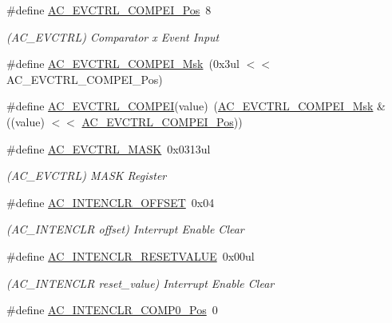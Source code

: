 \begin{DoxyCompactItemize}
\item 
\#define \mbox{\hyperlink{group___s_a_m_d21___a_c_ga3ecb80c6d080322ab734ade29f0fb26e}{A\+C\+\_\+\+E\+V\+C\+T\+R\+L\+\_\+\+C\+O\+M\+P\+E\+I\+\_\+\+Pos}}~8
\begin{DoxyCompactList}\small\item\em (A\+C\+\_\+\+E\+V\+C\+T\+RL) Comparator x Event Input \end{DoxyCompactList}\item 
\#define \mbox{\hyperlink{group___s_a_m_d21___a_c_ga232a5136dbe43c2aad98fa1cb2cb702f}{A\+C\+\_\+\+E\+V\+C\+T\+R\+L\+\_\+\+C\+O\+M\+P\+E\+I\+\_\+\+Msk}}~(0x3ul $<$$<$ A\+C\+\_\+\+E\+V\+C\+T\+R\+L\+\_\+\+C\+O\+M\+P\+E\+I\+\_\+\+Pos)
\item 
\#define \mbox{\hyperlink{group___s_a_m_d21___a_c_ga76a37d2193149d76c4fffe6ca4372c97}{A\+C\+\_\+\+E\+V\+C\+T\+R\+L\+\_\+\+C\+O\+M\+P\+EI}}(value)~(\mbox{\hyperlink{group___s_a_m_d21___a_c_ga232a5136dbe43c2aad98fa1cb2cb702f}{A\+C\+\_\+\+E\+V\+C\+T\+R\+L\+\_\+\+C\+O\+M\+P\+E\+I\+\_\+\+Msk}} \& ((value) $<$$<$ \mbox{\hyperlink{group___s_a_m_d21___a_c_ga3ecb80c6d080322ab734ade29f0fb26e}{A\+C\+\_\+\+E\+V\+C\+T\+R\+L\+\_\+\+C\+O\+M\+P\+E\+I\+\_\+\+Pos}}))
\item 
\#define \mbox{\hyperlink{group___s_a_m_d21___a_c_ga6cdb3ec1006044a008363289c16bb6a5}{A\+C\+\_\+\+E\+V\+C\+T\+R\+L\+\_\+\+M\+A\+SK}}~0x0313ul
\begin{DoxyCompactList}\small\item\em (A\+C\+\_\+\+E\+V\+C\+T\+RL) M\+A\+SK Register \end{DoxyCompactList}\item 
\#define \mbox{\hyperlink{group___s_a_m_d21___a_c_gad6b968b57c8516a8820878fd349e0d3c}{A\+C\+\_\+\+I\+N\+T\+E\+N\+C\+L\+R\+\_\+\+O\+F\+F\+S\+ET}}~0x04
\begin{DoxyCompactList}\small\item\em (A\+C\+\_\+\+I\+N\+T\+E\+N\+C\+LR offset) Interrupt Enable Clear \end{DoxyCompactList}\item 
\#define \mbox{\hyperlink{group___s_a_m_d21___a_c_gaa39f9b02199c37ef041fc8e0d31e231d}{A\+C\+\_\+\+I\+N\+T\+E\+N\+C\+L\+R\+\_\+\+R\+E\+S\+E\+T\+V\+A\+L\+UE}}~0x00ul
\begin{DoxyCompactList}\small\item\em (A\+C\+\_\+\+I\+N\+T\+E\+N\+C\+LR reset\+\_\+value) Interrupt Enable Clear \end{DoxyCompactList}\item 
\#define \mbox{\hyperlink{group___s_a_m_d21___a_c_ga4168c6a55362a465c232cdfae855edb6}{A\+C\+\_\+\+I\+N\+T\+E\+N\+C\+L\+R\+\_\+\+C\+O\+M\+P0\+\_\+\+Pos}}~0

\end{DoxyCompactItemize}
